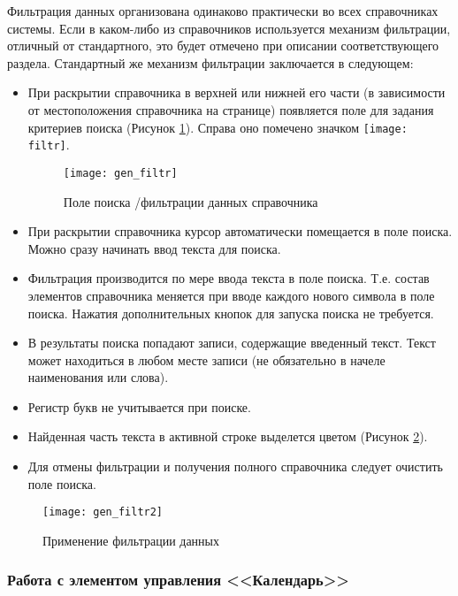 Фильтрация данных организована одинаково практически во всех справочниках системы. Если в каком-либо из справочников используется механизм фильтрации, отличный от стандартного, это будет отмечено при описании соответствующего раздела. Стандартный же механизм фильтрации заключается в следующем:
\begin{itemize}
 \item При раскрытии справочника в верхней или нижней его части (в зависимости от местоположения справочника на странице) появляется поле для задания критериев поиска (Рисунок \ref{img_gen_filtr}). Справа оно помечено значком \texttt{[image: filtr]}.
 
 \begin{figure}[!ht]\centering
 	\texttt{[image: gen\_filtr]}
 	\caption{Поле поиска \slash фильтрации данных справочника}
 	\label{img_gen_filtr}
 \end{figure} 
 
 \item При раскрытии справочника курсор автоматически помещается в поле поиска. Можно сразу начинать ввод текста для поиска.
 \item Фильтрация производится по мере ввода текста в поле поиска. Т.е. состав элементов справочника меняется при вводе каждого нового символа в поле поиска. Нажатия дополнительных кнопок для запуска поиска не требуется.
 \item В результаты поиска попадают записи, содержащие введенный текст. Текст может находиться в любом месте записи (не обязательно в начеле наименования или слова).
 \item Регистр букв не учитывается при поиске.
 \item Найденная часть текста в активной строке выделется цветом (Рисунок \ref{img_gen_filtr2}).
 \item Для отмены фильтрации и получения полного справочника следует очистить поле поиска.
\end{itemize} 

\begin{figure}[!ht]\centering
	\texttt{[image: gen\_filtr2]}
	\caption{Применение фильтрации данных}
	\label{img_gen_filtr2}
\end{figure}  

\subsubsection{Работа с элементом управления <<Календарь>>} \label{gen_cal}


